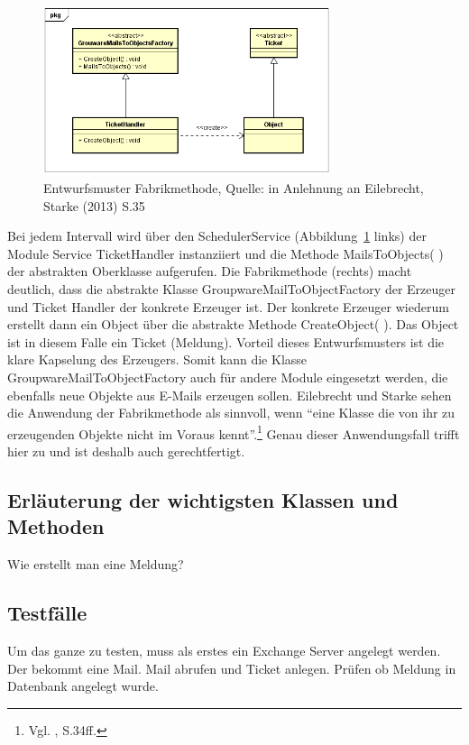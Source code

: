 \begin{figure}[h!]
\centering
\includegraphics[width=0.75\textwidth]{Abbildungen/Entwurfsmuster.png}
	\caption[Entwurfsmuster Fabrikmethode]{Entwurfsmuster Fabrikmethode, Quelle: in Anlehnung an Eilebrecht, Starke (2013) S.35}
	\label{fig:Entwurfsmuster}
\end{figure}

\noindent
Bei jedem Intervall wird über den SchedulerService (Abbildung~\ref{fig:Entwurfsmuster} links) der Module Service TicketHandler instanziiert und die Methode MailsToObjects( ) der abstrakten Oberklasse aufgerufen. Die Fabrikmethode (rechts) macht deutlich, dass die abstrakte Klasse GroupwareMailToObjectFactory der Erzeuger und Ticket Handler der konkrete Erzeuger ist. Der konkrete Erzeuger wiederum erstellt dann ein Object über die abstrakte Methode CreateObject( ). Das Object ist in diesem Falle ein Ticket (Meldung). Vorteil dieses Entwurfsmusters ist die klare Kapselung des Erzeugers. Somit kann die Klasse GroupwareMailToObjectFactory auch für andere Module eingesetzt werden, die ebenfalls neue Objekte aus E-Mails erzeugen sollen. Eilebrecht und Starke sehen die Anwendung der Fabrikmethode als sinnvoll, wenn \enquote{eine Klasse die von ihr zu erzeugenden Objekte nicht im Voraus kennt}.\footnote{Vgl. \citeauthor{PatternsKompakt} \citeyear{PatternsKompakt}, S.34ff.} Genau dieser Anwendungsfall trifft hier zu und ist deshalb auch gerechtfertigt.\\






\subsection{Erläuterung der wichtigsten Klassen und Methoden}
\noindent
Wie erstellt man eine Meldung?


\subsection{Testfälle}
\noindent
Um das ganze zu testen, muss als erstes ein Exchange Server angelegt werden. Der bekommt eine Mail. Mail abrufen und Ticket anlegen. Prüfen ob Meldung in Datenbank angelegt wurde.



